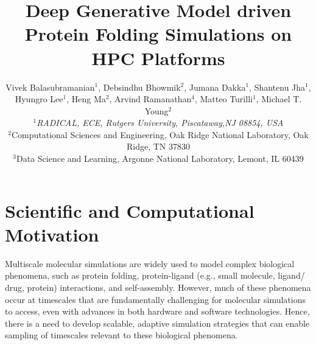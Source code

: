 \documentclass[conference,final]{IEEEtran}
\begin{document}
\title{Deep Generative Model driven Protein Folding Simulations on HPC Platforms}
\author{Vivek Balasubramanian$^{1}$, Debsindhu Bhowmik$^{2}$, Jumana Dakka$^{1}$, Shantenu Jha$^{1}$, \\ Hyungro Lee$^{1}$, Heng Ma$^{2}$, Arvind Ramanathan$^{4}$, Matteo Turilli$^{1}$, Michael T. Young$^{2}$ \\
   {\footnotesize{\emph{$^{1}$RADICAL, ECE, Rutgers University, Piscataway,NJ 08854, USA}}}\\
   \footnotesize{\emph{$^{2}$}}Computational Sciences and Engineering, Oak Ridge National Laboratory, Oak Ridge, TN 37830\\
   \footnotesize{\emph{$^{3}$}}Data Science and Learning, Argonne National Laboratory, Lemont, IL 60439\\
   }


\date{}
\maketitle

\section{Scientific  and Computational Motivation}

Multiscale molecular simulations are widely used to model complex biological phenomena, such as protein folding, protein-ligand (e.g., small molecule, ligand/ drug, protein) interactions, and self-assembly. However, much of these phenomena occur at timescales that are fundamentally challenging for molecular simulations to access, even with advances in both hardware and software technologies. Hence, there is a need to develop scalable, adaptive simulation strategies that can enable sampling of timescales relevant to these biological phenomena. 
\end{document}
